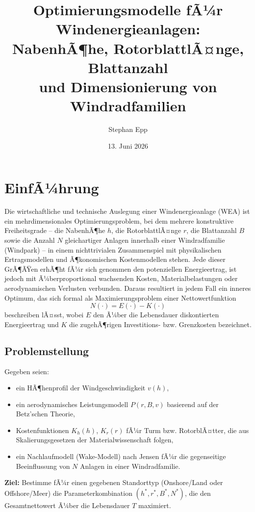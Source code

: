 ﻿\documentclass[a4paper,12pt]{article}
\title{Optimierungsmodelle fÃ¼r Windenergieanlagen:\\
NabenhÃ¶he, RotorblattlÃ¤nge, Blattanzahl\\
und Dimensionierung von Windradfamilien}
\author{Stephan Epp}
\date{13. Juni 2026}
\theoremstyle{definition}
\begin{document}
\maketitle

\tableofcontents
\newpage

\section{EinfÃ¼hrung}

Die wirtschaftliche und technische Auslegung einer Windenergieanlage (WEA) ist ein mehrdimensionales Optimierungsproblem, bei dem mehrere konstruktive Freiheitsgrade -- die NabenhÃ¶he $h$, die RotorblattlÃ¤nge $r$, die Blattanzahl $B$ sowie die Anzahl $N$ gleichartiger Anlagen innerhalb einer Windradfamilie (Windpark) -- in einem nichttrivialen Zusammenspiel mit physikalischen Ertragsmodellen und Ã¶konomischen Kostenmodellen stehen. Jede dieser GrÃ¶ÃŸen erhÃ¶ht fÃ¼r sich genommen den potenziellen Energieertrag, ist jedoch mit Ã¼berproportional wachsenden Kosten, Materialbelastungen oder aerodynamischen Verlusten verbunden. Daraus resultiert in jedem Fall ein inneres Optimum, das sich formal als Maximierungsproblem einer Nettowertfunktion
\[
N(\cdot) = E(\cdot) - K(\cdot)
\]
beschreiben lÃ¤sst, wobei $E$ den Ã¼ber die Lebensdauer diskontierten Energieertrag und $K$ die zugehÃ¶rigen Investitions- bzw. Grenzkosten bezeichnet.

\subsection{Problemstellung}

Gegeben seien:
\begin{itemize}
	\item ein HÃ¶henprofil der Windgeschwindigkeit $v(h)$,
	\item ein aerodynamisches Leistungsmodell $P(r, B, v)$ basierend auf der Betz'schen Theorie,
	\item Kostenfunktionen $K_h(h)$, $K_r(r)$ fÃ¼r Turm bzw. RotorblÃ¤tter, die aus Skalierungsgesetzen der Materialwissenschaft folgen,
	\item ein Nachlaufmodell (Wake-Modell) nach Jensen fÃ¼r die gegenseitige Beeinflussung von $N$ Anlagen in einer Windradfamilie.
\end{itemize}

\textbf{Ziel:} Bestimme fÃ¼r einen gegebenen Standorttyp (Onshore/Land oder Offshore/Meer) die Parameterkombination $(h^*, r^*, B^*, N^*)$, die den Gesamtnettowert Ã¼ber die Lebensdauer $T$ maximiert.
\end{document}
